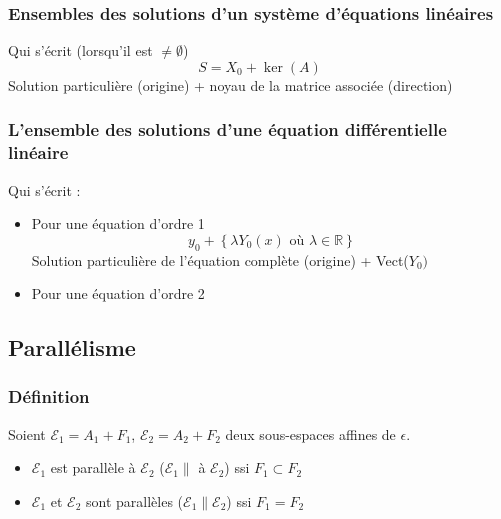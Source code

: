 \documentclass[12pt,a4paper,french]{book}
\begin{document}
			\subsubsection{Ensembles des solutions d'un système d'équations linéaires}
				Qui s'écrit (lorsqu'il est $\neq \emptyset$)
				\[S = X_0 + \ker(A)\] Solution particulière (origine) + noyau de la matrice associée (direction)
			\subsubsection{L'ensemble des solutions d'une équation différentielle linéaire}
				Qui s'écrit :
				\begin{itemize}
					\item Pour une équation d'ordre 1
					\[y_0 + \left\lbrace \lambda Y_0(x) \mbox{ où } \lambda \in \mathbb{R}\right\rbrace \]
					Solution particulière de l'équation complète (origine) + Vect($Y_0)$
					\item Pour une équation d'ordre 2
				\end{itemize}
		\subsection{Parallélisme}
			\subsubsection{Définition}
				Soient $\mathcal{E}_1 = A_1 + F_1$, $\mathcal{E}_2 = A_2 + F_2$ deux sous-espaces affines de $\epsilon$.
				\begin{itemize}
					\item $\mathcal{E}_1$ est parallèle à $\mathcal{E}_2$ ($\mathcal{E}_1 \parallel $ à $ \mathcal{E}_2$) ssi $F_1 \subset F_2$
					\item $\mathcal{E}_1$ et $\mathcal{E}_2$ sont parallèles ($\mathcal{E}_1 \parallel \mathcal{E}_2$) ssi $F_1 = F_2$
				\end{itemize}
\end{document}
